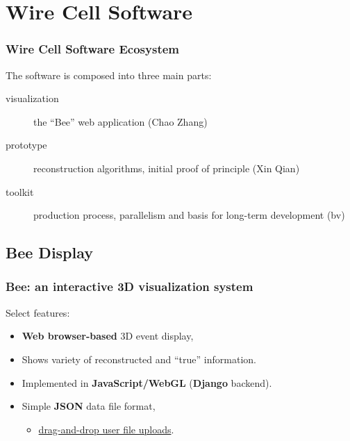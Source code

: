 \section{Wire Cell Software}

\begin{frame}
\end{frame}


\begin{frame}
  \frametitle{Wire Cell Software Ecosystem}

  The software is composed into three main parts:

  \vspace{3mm}

  \begin{description}
  \item[visualization] the ``Bee'' web application (Chao Zhang)
  \item[prototype] reconstruction algorithms, initial proof of
    principle (Xin Qian)
  \item[toolkit] production process, parallelism and basis for long-term development (bv)
  \end{description}

\end{frame}

\subsection{Bee Display}

\begin{frame}
  \frametitle{Bee: an interactive 3D visualization system}

  Select features:
  \begin{itemize}
  \item \textbf{Web browser-based} 3D event display, 
  \item Shows variety of reconstructed and ``true'' information.
  \item Implemented in \textbf{JavaScript/WebGL} (\textbf{Django} backend).
  \item Simple \textbf{JSON} data file format, 
    \begin{itemize}
    \item \href{http://bnlif.github.io/wire-cell-docs/viz/uploads/}{drag-and-drop user
      file uploads}.
    \end{itemize}
  \end{itemize}


\end{frame}

